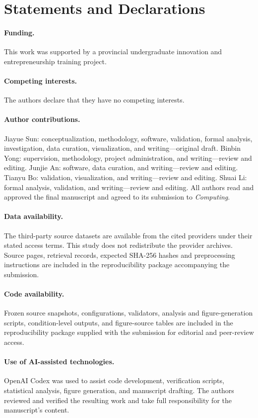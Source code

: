 \documentclass[smallextended]{svjour3}
\begin{document}
\section*{Statements and Declarations}
\paragraph{Funding.} This work was supported by a provincial undergraduate innovation and entrepreneurship training project.
\paragraph{Competing interests.} The authors declare that they have no competing interests.
\paragraph{Author contributions.} Jiayue Sun: conceptualization, methodology, software, validation, formal analysis, investigation, data curation, visualization, and writing---original draft. Binbin Yong: supervision, methodology, project administration, and writing---review and editing. Junjie An: software, data curation, and writing---review and editing. Tianyu Bo: validation, visualization, and writing---review and editing. Shuai Li: formal analysis, validation, and writing---review and editing. All authors read and approved the final manuscript and agreed to its submission to \textit{Computing}.
\paragraph{Data availability.} The third-party source datasets are available from the cited providers under their stated access terms. This study does not redistribute the provider archives. Source pages, retrieval records, expected SHA-256 hashes and preprocessing instructions are included in the reproducibility package accompanying the submission.
\paragraph{Code availability.} Frozen source snapshots, configurations, validators, analysis and figure-generation scripts, condition-level outputs, and figure-source tables are included in the reproducibility package supplied with the submission for editorial and peer-review access.
\paragraph{Use of AI-assisted technologies.} OpenAI Codex was used to assist code development, verification scripts, statistical analysis, figure generation, and manuscript drafting. The authors reviewed and verified the resulting work and take full responsibility for the manuscript's content.

\end{document}

